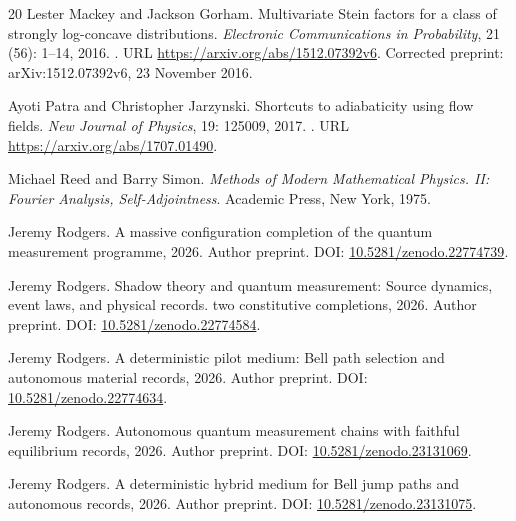 \documentclass[11pt]{article}
\numberwithin{equation}{section}
\theoremstyle{definition}
\begin{document}
\begin{thebibliography}{20}
Lester Mackey and Jackson Gorham.
\newblock Multivariate {Stein} factors for a class of strongly log-concave
  distributions.
\newblock \emph{Electronic Communications in Probability}, 21
  (56): 1--14, 2016.
\newblock {}.
\newblock URL \url{https://arxiv.org/abs/1512.07392v6}.
\newblock Corrected preprint: arXiv:1512.07392v6, 23 November 2016.

Ayoti Patra and Christopher Jarzynski.
\newblock Shortcuts to adiabaticity using flow fields.
\newblock \emph{New Journal of Physics}, 19: 125009, 2017.
\newblock {}.
\newblock URL \url{https://arxiv.org/abs/1707.01490}.

Michael Reed and Barry Simon.
\newblock \emph{Methods of Modern Mathematical Physics. {II}: {Fourier}
  Analysis, Self-Adjointness}.
\newblock Academic Press, New York, 1975.

Jeremy Rodgers.
\newblock A massive configuration completion of the quantum measurement
  programme, 2026{}.
\newblock Author preprint. DOI: \href{https://doi.org/10.5281/zenodo.22774739}{10.5281/zenodo.22774739}.

Jeremy Rodgers.
\newblock Shadow theory and quantum measurement: Source dynamics, event laws,
  and physical records. two constitutive completions, 2026{}.
\newblock Author preprint. DOI: \href{https://doi.org/10.5281/zenodo.22774584}{10.5281/zenodo.22774584}.

Jeremy Rodgers.
\newblock A deterministic pilot medium: Bell path selection and autonomous
  material records, 2026{}.
\newblock Author preprint. DOI: \href{https://doi.org/10.5281/zenodo.22774634}{10.5281/zenodo.22774634}.

Jeremy Rodgers.
\newblock Autonomous quantum measurement chains with faithful equilibrium
  records, 2026{}.
\newblock Author preprint. DOI: \href{https://doi.org/10.5281/zenodo.23131069}{10.5281/zenodo.23131069}.

Jeremy Rodgers.
\newblock A deterministic hybrid medium for {Bell} jump paths and autonomous
  records, 2026{}.
\newblock Author preprint. DOI: \href{https://doi.org/10.5281/zenodo.23131075}{10.5281/zenodo.23131075}.


\end{thebibliography}
\end{document}

